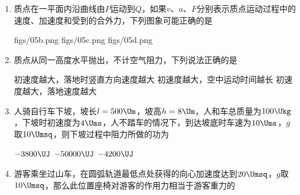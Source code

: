 \documentclass[\gkver]{gaokaozhenti}
\begin{document}
\begin{enumerate}
{拉力在竖直方向的分量一定等于重力}
{拉力在水平方向的分量一定大于摩擦力}
{拉力在水平方向的分量一定等于摩擦力}


\item
质点在一平面内沿曲线由$P$运动到$Q$，如果$v$、$a$、$F$分别表示质点运动过程中的速度、加速度和受到的合外力，下列图象可能正确的是

{figs/05b.png}
{figs/05c.png}
{figs/05d.png}


\item
质点从同一高度水平抛出，不计空气阻力，下列说法正确的是

{初速度越大，落地时竖直方向速度越大}
{初速度越大，空中运动时间越长}
{初速度越大，落地速度越大}


\item
人骑自行车下坡，坡长$l=500\Um$，坡高$h=8\Um$，人和车总质量为$100\Ukg$，下坡时初速度为$4\Ums$，人不踏车的情况下，到达坡底时车速为$10\Ums$，$g$取$10\Umsq$，则下坡过程中阻力所做的功为

\fourchoices[answer=B]
{$-400\UJ$}
{$-3800\UJ$}
{$-50000\UJ$}
{$-4200\UJ$}


\item
游客乘坐过山车，在圆弧轨道最低点处获得的向心加速度达到$20\Umsq$，$g$取$10\Umsq$，那么此位置座椅对游客的作用力相当于游客重力的


\end{enumerate}
\end{document}
